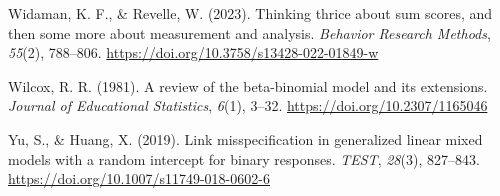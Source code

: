 \documentclass[
  man,
  floatsintext,
  longtable,
  nolmodern,
  notxfonts,
  notimes,
  colorlinks=true,linkcolor=blue,citecolor=blue,urlcolor=blue]{apa7}
\newlength{\cslhangindent}
\newenvironment{CSLReferences}[2] %
 {\begin{list}{}{%
  \setlength{\itemindent}{0pt}
  \setlength{\leftmargin}{0pt}
  \setlength{\parsep}{0pt}
  \ifodd #1
   \setlength{\leftmargin}{\cslhangindent}
   \setlength{\itemindent}{-1\cslhangindent}
  \fi
  \setlength{\itemsep}{#2\baselineskip}}}
 {\end{list}}
\begin{document}
\begin{CSLReferences}{1}{0}
Widaman, K. F., \& Revelle, W. (2023). Thinking thrice about sum scores,
and then some more about measurement and analysis. \emph{Behavior
Research Methods}, \emph{55}(2), 788--806.
\url{https://doi.org/10.3758/s13428-022-01849-w}

Wilcox, R. R. (1981). A review of the beta-binomial model and its
extensions. \emph{Journal of Educational Statistics}, \emph{6}(1),
3--32. \url{https://doi.org/10.2307/1165046}

Yu, S., \& Huang, X. (2019). Link misspecification in generalized linear
mixed models with a random intercept for binary responses. \emph{TEST},
\emph{28}(3), 827--843. \url{https://doi.org/10.1007/s11749-018-0602-6}

\end{CSLReferences}
\end{document}
